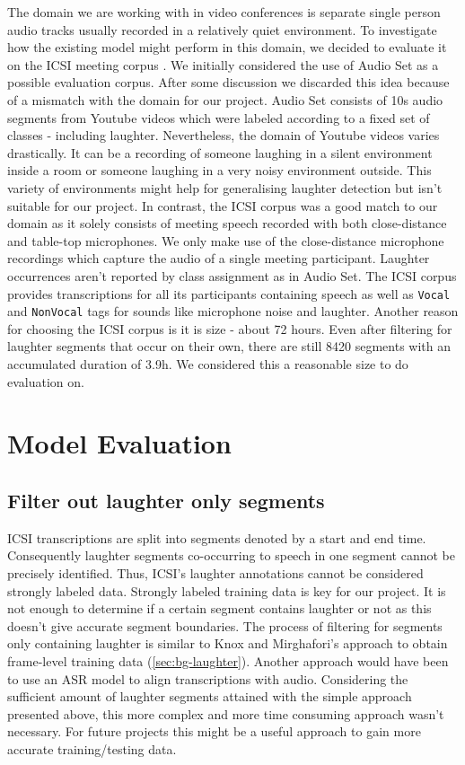 \documentclass[bsc,frontabs,parskip,deptreport]{infthesis}
\begin{document}
The domain we are working with in video conferences is separate single person audio tracks usually recorded in a relatively quiet environment.
To investigate how the existing model might perform in this domain, we decided to evaluate it on the ICSI meeting corpus \citep{morgan2001meeting}. 
We initially considered the use of Audio Set \citep{googleaudioset} as a possible evaluation corpus. After some discussion we discarded this idea because of a mismatch with the domain for our project. Audio Set  consists of 10s audio segments from Youtube videos which were labeled according to a fixed set of classes - including laughter. Nevertheless, the domain of Youtube videos varies drastically. It can be a recording of someone laughing in a silent environment inside a room or someone laughing in a very noisy environment outside. This variety of environments might help for generalising laughter detection but isn't suitable for our project.
In contrast, the ICSI corpus was a good match to our domain as it solely consists of meeting speech recorded with both close-distance and table-top microphones. 
We only make use of the close-distance microphone recordings which capture the audio of a single meeting participant.
Laughter occurrences aren't reported by class assignment as in Audio Set. The ICSI corpus provides transcriptions for all its participants containing speech as well as \texttt{Vocal} and \texttt{NonVocal} tags for sounds like microphone noise and laughter. 
Another reason for choosing the ICSI corpus is it is size - about 72 hours.
Even after filtering for laughter segments that occur on their own, there are still 8420 segments with an accumulated duration of 3.9h. 
We considered this a reasonable size to do evaluation on. 




\section{Model Evaluation} \label{sec:model-eval}

\subsection{Filter out laughter only segments} \label{subsec:filter-laughter}
ICSI transcriptions are split into segments denoted by a start and end time.
Consequently laughter segments co-occurring to speech in one segment cannot be precisely identified.
Thus, ICSI's laughter annotations cannot be considered strongly labeled data.
Strongly labeled training data is key for our project.
It is not enough to determine if a certain segment contains laughter or not as this doesn't give accurate segment boundaries. 
The process of filtering for segments only containing laughter is similar to Knox and Mirghafori's approach to obtain frame-level training data \citep{knox2006automatic} (\ref{sec:bg-laughter}). 
Another approach would have been to use an ASR model to align transcriptions with audio. Considering the sufficient amount of laughter segments attained with the simple approach presented above, this more complex and more time consuming approach wasn't necessary. For future projects this might be a useful approach to gain more accurate training/testing data. 
\end{document}
